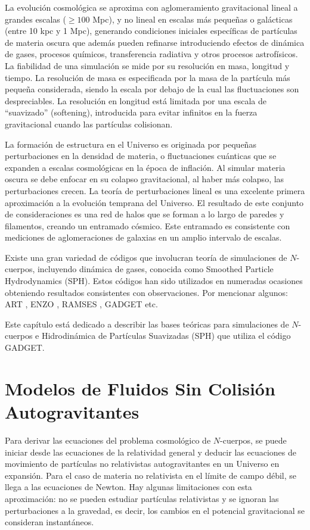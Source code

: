 \documentclass[a4paper,openright,10pt, oneside, final]{book}
\begin{document}
La evolución cosmológica se aproxima con aglomeramiento gravitacional lineal a grandes escalas ($\geq100$ Mpc), y no lineal en escalas más pequeñas o galácticas (entre 10 kpc y 1 Mpc), generando condiciones iniciales específicas de partículas de materia oscura que además pueden refinarse introduciendo efectos de dinámica de gases, procesos químicos, transferencia radiativa y otros procesos astrofísicos. La fiabilidad de una simulación se mide por su resolución en masa, longitud y tiempo. La resolución de masa es especificada por la masa de la partícula más pequeña considerada, siendo la escala por debajo de la cual las fluctuaciones son despreciables. La resolución en longitud está limitada por una escala de ``suavizado'' (softening), introducida para evitar infinitos en la fuerza gravitacional cuando las partículas colisionan.

La formación de estructura en el Universo es originada por pequeñas perturbaciones en la densidad de materia, o fluctuaciones cuánticas que se expanden a escalas cosmológicas en la época de inflación. Al simular materia oscura se debe enfocar en su colapso gravitacional, al haber más colapso, las perturbaciones crecen. La teoría de perturbaciones lineal es una excelente primera aproximación a la evolución temprana del Universo. El resultado de este conjunto de consideraciones es una red de halos que se forman a lo largo de paredes y filamentos, creando un entramado cósmico. Este entramado es consistente con mediciones de aglomeraciones de galaxias en un amplio intervalo de escalas.

Existe una gran variedad de códigos que involucran teoría de simulaciones de $N$-cuerpos, incluyendo dinámica de gases, conocida como Smoothed Particle Hydrodynamics (SPH). Estos códigos han sido utilizados en numeradas ocasiones obteniendo resultados consistentes con observaciones. Por mencionar algunos: ART \cite{2.1.1}, ENZO \cite{2.1.2}, RAMSES \cite{2.1.3}, GADGET \cite{b4} etc.

Este capítulo está dedicado a describir las bases teóricas para simulaciones de $N$-cuerpos e Hidrodinámica de Partículas Suavizadas (SPH) que utiliza el código GADGET.

\section{Modelos de Fluidos Sin Colisión Autogravitantes}
Para derivar las ecuaciones del problema cosmológico de $N$-cuerpos, se puede iniciar desde las ecuaciones de la relatividad general y deducir las ecuaciones de movimiento de partículas no relativistas autogravitantes en un Universo en expansión. Para el caso de materia no relativista en el límite de campo débil, se llega a las ecuaciones de Newton. Hay algunas limitaciones con esta aproximación: no se pueden estudiar partículas relativistas y se ignoran las perturbaciones a la gravedad, es decir, los cambios en el potencial gravitacional se consideran instantáneos.
\end{document}
